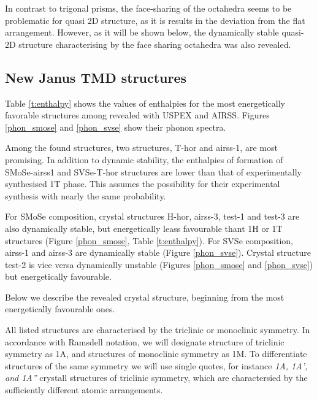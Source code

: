 \documentclass[a4paperm]{article}
\begin{document}
In contrast to trigonal prisms, the face-sharing of the octahedra seems to be problematic for quasi 2D structure, as it is results in the deviation from the flat arrangement.
However, as it will be shown below, the dynamically stable quasi-2D structure characterising by the face sharing octahedra was also revealed.



		\subsection{New Janus TMD structures}

Table \ref{t:enthalpy} shows the values of enthalpies for the most energetically favorable structures among revealed with USPEX and AIRSS.
 Figures \ref{phon_smose} and  \ref{phon_svse} show their phonon spectra. 
 
Among the found structures, two structures, T-hor and airss-1, are most promising.
In addition to dynamic stability, the enthalpies of formation of SMoSe-airss1 and SVSe-T-hor structures are lower than that of experimentally synthesised 1T phase.
This assumes the possibility for their experimental synthesis with nearly the same probability.

For SMoSe composition, crystal structures H-hor, airss-3, test-1 and test-3 are also dynamically stable, but energetically leass favourable thant 1H or 1T structures (Figure \ref{phon_smose}, Table \ref{t:enthalpy}).
For SVSe composition, airss-1 and airss-3 are dynamically stable (Figure \ref{phon_svse}).
Crystal structure test-2 is vice versa dynamically unstable (Figures \ref{phon_smose} and \ref{phon_svse}) but energetically favourable. 

Below we describe the revealed crystal structure, beginning from the most energetically favourable ones.

All listed structures are characterised by the triclinic or monocliniс symmetry.
In accordance with Ramsdell notation, we will designate structure of triclinic symmetry as 1A, and structures of monoclinic symmetry as 1M.
To differentiate structures of the same symmetry we will use single quotes, for instance {\it 1A, 1A', and 1A''} crystall structures of triclinic symmetry, which are charactersied by the sufficiently different atomic arrangements.

\end{document}
